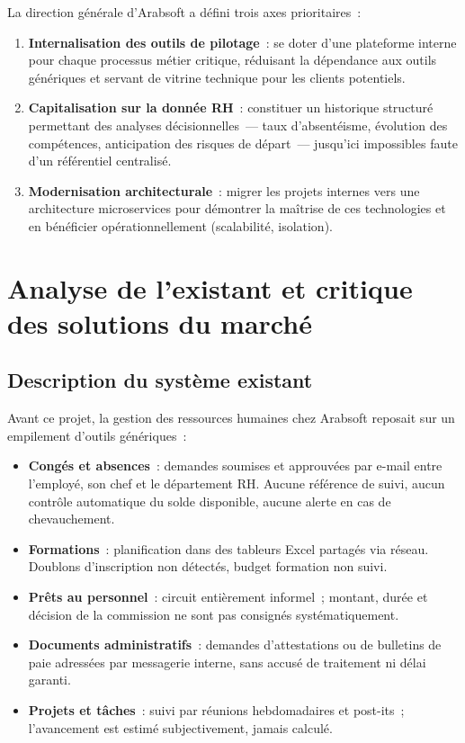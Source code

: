 La direction générale d'Arabsoft a défini trois axes prioritaires~:
\begin{enumerate}
  \item \textbf{Internalisation des outils de pilotage}~: se doter d'une
        plateforme interne pour chaque processus métier critique, réduisant
        la dépendance aux outils génériques et servant de vitrine technique
        pour les clients potentiels.
  \item \textbf{Capitalisation sur la donnée RH}~: constituer un historique
        structuré permettant des analyses décisionnelles~--- taux d'absentéisme,
        évolution des compétences, anticipation des risques de départ~--- jusqu'ici
        impossibles faute d'un référentiel centralisé.
  \item \textbf{Modernisation architecturale}~: migrer les projets internes
        vers une architecture microservices pour démontrer la maîtrise de ces
        technologies et en bénéficier opérationnellement (scalabilité, isolation).
\end{enumerate}

\section{Analyse de l'existant et critique des solutions du marché}

\subsection{Description du système existant}

Avant ce projet, la gestion des ressources humaines chez Arabsoft reposait sur
un empilement d'outils génériques~:

\begin{itemize}
  \item \textbf{Congés et absences}~: demandes soumises et approuvées par e-mail
        entre l'employé, son chef et le département RH. Aucune référence de suivi,
        aucun contrôle automatique du solde disponible, aucune alerte en cas
        de chevauchement.
  \item \textbf{Formations}~: planification dans des tableurs Excel partagés via
        réseau. Doublons d'inscription non détectés, budget formation non suivi.
  \item \textbf{Prêts au personnel}~: circuit entièrement informel~; montant,
        durée et décision de la commission ne sont pas consignés systématiquement.
  \item \textbf{Documents administratifs}~: demandes d'attestations ou de
        bulletins de paie adressées par messagerie interne, sans accusé de
        traitement ni délai garanti.
  \item \textbf{Projets et tâches}~: suivi par réunions hebdomadaires et post-its~;
        l'avancement est estimé subjectivement, jamais calculé.
\end{itemize}

